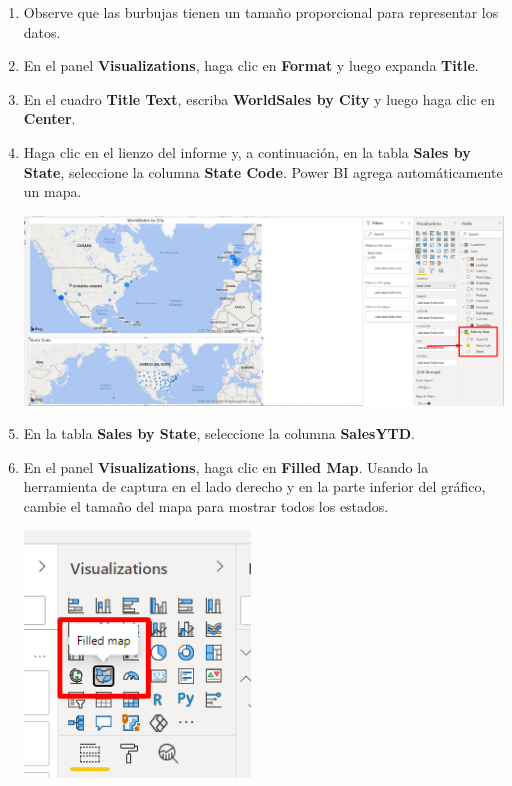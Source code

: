 \documentclass[12pt,letterpaper]{article}
\newcommand\tab[1][1cm]{\hspace*{#1}}
\begin{document}
\begin{enumerate}[\tab 1.]
\begin{center}
        \end{center}
        \item Observe que las burbujas tienen un tamaño proporcional para representar los datos.
        \item En el panel \textbf{Visualizations}, haga clic en \textbf{Format} y luego expanda \textbf{Title}.
        \item En el cuadro \textbf{Title Text}, escriba \textbf{WorldSales by City} y luego haga clic en \textbf{Center}.
        \item Haga clic en el lienzo del informe y, a continuación, en la tabla \textbf{Sales by State}, seleccione la columna \textbf{State Code}. Power BI agrega automáticamente un mapa.
        \begin{center}
            \includegraphics[width=13cm]{./img/img126.png}
        \end{center}
        \item En la tabla \textbf{Sales by State}, seleccione la columna \textbf{SalesYTD}.
        \item En el panel \textbf{Visualizations}, haga clic en \textbf{Filled Map}. Usando la herramienta de captura en el lado derecho y en la parte inferior del gráfico, cambie el tamaño del mapa para mostrar todos los estados.
        \begin{center}
            \includegraphics[width=6cm]{./img/img128.png}

\end{center}
\end{enumerate}
\end{document}
